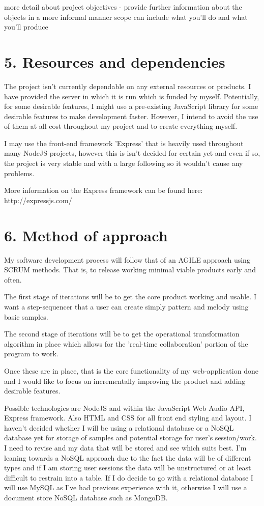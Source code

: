 \documentclass[a4paper]{article}
\begin{document}
more detail about project objectives
- provide further information about the objects in a more informal manner
scope can include what you'll do and what you'll produce

\section{5. Resources and dependencies}

The project isn't currently dependable on any external resources or products. I have provided the server in which it is run which is funded by myself. Potentially, for some desirable features, I might use a pre-existing JavaScript library for some desirable features to make development faster. However, I intend to avoid the use of them at all cost throughout my project and to create everything myself.

I may use the front-end framework 'Express' that is heavily used throughout many NodeJS projects, however this is isn't decided for certain yet and even if so, the project is very stable and with a large following so it wouldn't cause any problems.

More information on the Express framework can be found here: http://expressjs.com/

\section{6. Method of approach}

My software development process will follow that of an AGILE approach using SCRUM methods. That is, to release working minimal viable products early and often. 

The first stage of iterations will be to get the core product working and usable. I want a step-sequencer that a user can create simply pattern and melody using basic samples.

The second stage of iterations will be to get the operational transformation algorithm in place which allows for the 'real-time collaboration' portion of the program to work.

Once these are in place, that is the core functionality of my web-application done and I would like to focus on incrementally improving the product and adding desirable features.

Possible technologies are NodeJS and within the JavaScript Web Audio API, Express framework. Also HTML and CSS for all front end styling and layout. I haven't decided whether I will be using a relational database or a NoSQL database yet for storage of samples and potential storage for user's session/work. I need to revise and my data that will be stored and see which suits best. I'm leaning towards a NoSQL approach due to the fact the data will be of different types and if I am storing user sessions the data will be unstructured or at least difficult to restrain into a table. If I do decide to go with a relational database I will use MySQL as I've had previous experience with it, otherwise I will use a document store NoSQL database such as MongoDB.
\end{document}
